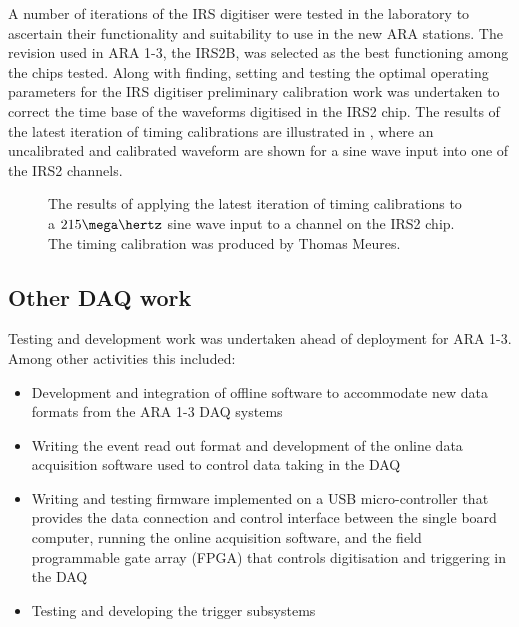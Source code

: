 A number of iterations of the IRS digitiser were tested in the laboratory to ascertain their functionality and suitability to use in the new ARA stations. The revision used in ARA 1-3, the IRS2B, was selected as the best functioning among the chips tested. Along with finding, setting and testing the optimal operating parameters for the IRS digitiser preliminary calibration work was undertaken to correct the time base of the waveforms digitised in the IRS2 chip. The results of the latest iteration of timing calibrations are illustrated in , where an uncalibrated and calibrated waveform are shown for a sine wave input into one of the IRS2 channels. 

\begin{figure}[htpb]
  \hfill
  \caption{The results of applying the latest iteration of timing calibrations to a $215 \mega \hertz$ sine wave input to a channel on the IRS2 chip. The timing calibration was produced by Thomas Meures.}
  \label{fig:calibration:ARA1-3-development:DDA-Waveforms}
\end{figure}

\subsection{Other DAQ work}
\label{sec:calibration:ARA1-3-development:Other-DAQ-work}

Testing and development work was undertaken ahead of deployment for ARA 1-3. Among other activities this included:

\begin{itemize}
\item Development and integration of offline software to accommodate new data formats from the ARA 1-3 DAQ systems
\item Writing the event read out format and development of the online data acquisition software used to control data taking in the DAQ
\item Writing and testing firmware implemented on a USB micro-controller that provides the data connection and control interface between the single board computer, running the online acquisition software, and the field programmable gate array (FPGA) that controls digitisation and triggering in the DAQ
\item Testing and developing the trigger subsystems
\end{itemize}


